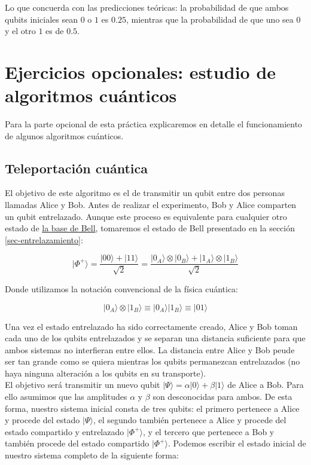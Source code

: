 \documentclass[11pt]{article}
\newcommand{\ra}{\rangle}
\theoremstyle{plain}
\begin{document}
Lo que concuerda con las predicciones teóricas: la probabilidad de que ambos qubits iniciales sean $0$ o $1$ es $0.25$, mientras que la probabilidad de que uno sea $0$ y el otro $1$ es de $0.5$.


\section{Ejercicios opcionales: estudio de algoritmos cuánticos}

Para la parte opcional de esta práctica explicaremos en detalle el funcionamiento de algunos algoritmos cuánticos.


\subsection{Teleportación cuántica}


El objetivo de este algoritmo es el de transmitir un qubit entre dos personas llamadas Alice y Bob. Antes de realizar el experimento, Bob y Alice comparten un qubit entrelazado. Aunque este proceso es equivalente para cualquier otro estado de \href{https://es.wikipedia.org/wiki/Base_de_Bell}{la base de Bell}, tomaremos el estado de Bell presentado en la sección \ref{sec-entrelazamiento}:

\[
	|\Phi^+\ra = \frac{|00\ra + |11\ra}{\sqrt 2} = \frac{|0_A\ra \otimes |0_B\ra + |1_A\ra \otimes |1_B\ra}{\sqrt 2}
\]

Donde utilizamos la notación convencional de la física cuántica:

\[
	|0_A\ra \otimes |1_B\ra \equiv |0_A\ra|1_B\ra  \equiv |01\ra 
\]

Una vez el estado entrelazado ha sido correctamente creado, Alice y Bob toman cada uno de los qubits entrelazados y se separan una distancia suficiente para que ambos sistemas no interfieran entre ellos. La distancia entre Alice y Bob peude ser tan grande como se quiera mientras los qubits permanezcan entrelazados (no haya ninguna alteración a los qubits en su transporte). \\

El objetivo será transmitir un nuevo qubit $|\Psi\ra = \alpha|0\ra + \beta|1\ra$ de Alice a Bob. Para ello asumimos que las amplitudes $\alpha$ y $\beta$ son desconocidas para ambos. De esta forma, nuestro sistema inicial consta de tres qubits: el primero pertenece a Alice y procede del estado $|\Psi\ra$, el segundo también pertenece a Alice y procede del estado compartido y entrelazado $|\Phi^+\ra$, y el tercero que pertenece a Bob y también procede del estado compartido $|\Phi^+\ra$. Podemos escribir el estado inicial de nuestro sistema completo de la siguiente forma:
\end{document}
